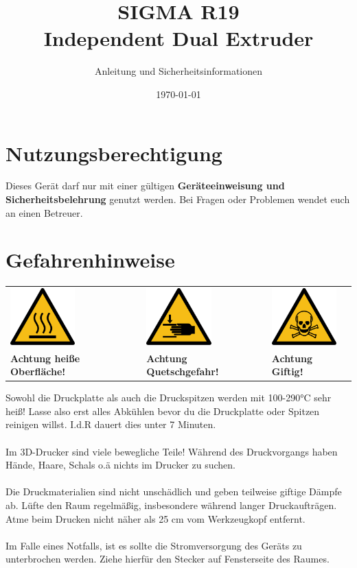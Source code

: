 \documentclass[a4paper]{article}
\begin{document}
\author{Anleitung und Sicherheitsinformationen} %
\title{SIGMA R19 \\ Independent Dual Extruder}
\date{\today{}} %
\maketitle{} %
\section{Nutzungsberechtigung}
Dieses Gerät darf nur mit einer gültigen \textbf{Geräteeinweisung und Sicherheitsbelehrung} genutzt werden. Bei Fragen oder Problemen wendet euch an einen Betreuer.
\section{Gefahrenhinweise}
\begin{center}
	\begin{tabular}{C{5cm}C{5cm}C{5cm}}
		\includegraphics[width=2.5cm]{hot-surface.png} & \includegraphics[width=2.5cm]{hand-injury.png} & \includegraphics[width=2.5cm]{toxic.png}\\
		\textbf{Achtung heiße Oberfläche!} & \textbf{Achtung Quetschgefahr!} & \textbf{Achtung Giftig!}
	\end{tabular}
\end{center}

		
 Sowohl die Druckplatte als auch die Druckspitzen werden mit 100-290°C sehr heiß!
 Lasse also erst alles Abkühlen bevor du die Druckplatte oder Spitzen reinigen willst.
 I.d.R dauert dies unter 7 Minuten.\\\\
Im 3D-Drucker sind viele bewegliche Teile! Während des Druckvorgangs haben Hände, Haare, Schals o.ä nichts im Drucker zu suchen.\\\\
Die Druckmaterialien sind nicht unschädlich und geben teilweise giftige Dämpfe ab. Lüfte den Raum regelmäßig, insbesondere während langer Druckaufträgen. Atme beim Drucken nicht näher als 25 cm vom Werkzeugkopf entfernt.\\\\
Im Falle eines Notfalls, ist es sollte die Stromversorgung des Geräts zu unterbrochen werden. Ziehe hierfür den Stecker auf Fensterseite des Raumes. 
\end{document}
